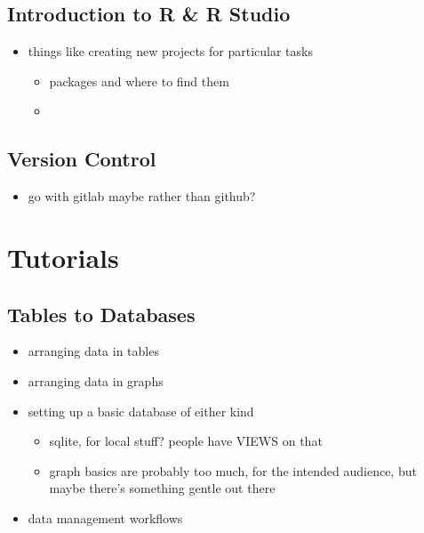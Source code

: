 \documentclass[
]{book}
\providecommand{\tightlist}{%
  \setlength{\itemsep}{0pt}\setlength{\parskip}{0pt}}
\begin{document}
\hypertarget{introduction-to-r-r-studio}{%
\section{Introduction to R \& R Studio}\label{introduction-to-r-r-studio}}

\begin{itemize}
\tightlist
\item
  things like creating new projects for particular tasks

  \begin{itemize}
  \tightlist
  \item
    packages and where to find them
  \item
  \end{itemize}
\end{itemize}

\hypertarget{version-control}{%
\section{Version Control}\label{version-control}}

\begin{itemize}
\tightlist
\item
  go with gitlab maybe rather than github?
\end{itemize}

\hypertarget{tutorials}{%
\chapter{Tutorials}\label{tutorials}}

\hypertarget{data-management}{%
\section{Tables to Databases}\label{data-management}}

\begin{itemize}
\tightlist
\item
  arranging data in tables
\item
  arranging data in graphs
\item
  setting up a basic database of either kind

  \begin{itemize}
  \tightlist
  \item
    sqlite, for local stuff? people have VIEWS on that
  \item
    graph basics are probably too much, for the intended audience, but maybe there's something gentle out there
  \end{itemize}
\item
  data management workflows
\end{itemize}
\end{document}
